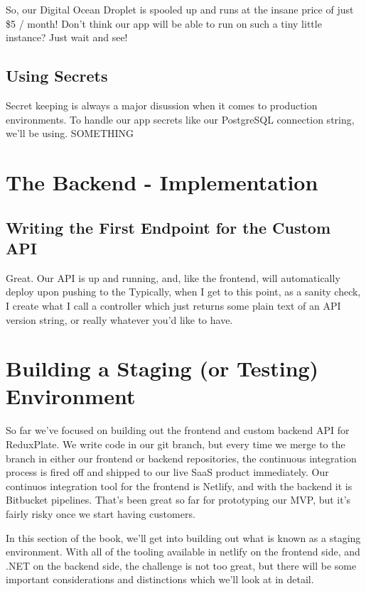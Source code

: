 \documentclass[a4paper,
                             oneside,
                             BCOR1.0cm,
                             DIV11,
                             parskip=full,
                             11pt]{scrbook}
\begin{document}
So, our Digital Ocean Droplet is spooled up and runs at the insane price of just \$5 / month! Don't think our app will be able to run on such a tiny little instance? Just wait and see!

\section{Using Secrets}

Secret keeping is always a major disussion when it comes to production environments. To handle our app secrets like our PostgreSQL connection string, we'll be using. SOMETHING

\chapter{The Backend - Implementation}

\section{Writing the First Endpoint for the Custom API}

Great. Our API is up and running, and, like the frontend, will automatically deploy upon pushing to the  Typically, when I get to this point, as a sanity check, I create what I call a  controller which just returns some plain text of an API version string, or really whatever you'd like to have.

\chapter{Building a Staging (or Testing) Environment}\label{cap:primer}

So far we've focused on building out the frontend and custom backend API for ReduxPlate. We write code in our  git branch, but every time we merge to the  branch in either our frontend or backend repositories, the continuous integration process is fired off and shipped to our live SaaS product immediately. Our continuos integration tool for the frontend is Netlify, and with the backend it is Bitbucket pipelines. That's been great so far for prototyping our MVP, but it's fairly risky once we start having customers.

In this section of the book, we'll get into building out what is known as a staging environment. With all of the tooling available in netlify on the frontend side, and .NET on the backend side, the challenge is not too great, but there will be some important considerations and distinctions which we'll look at in detail.
\end{document}
